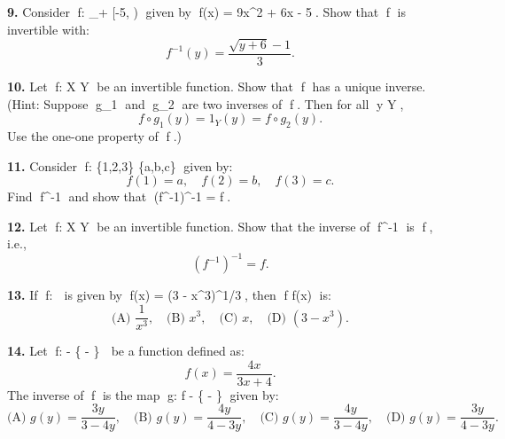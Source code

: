 \documentclass{article}
\begin{document}
\textbf{9.} Consider f: _+ \to [-5, \infty) given by f(x) = 9x^2 + 6x - 5. Show that f is invertible with:
\[
f^{-1}(y) = \frac{\sqrt{y+6} -1}{3}.
\]

\textbf{10.} Let f: X \to Y be an invertible function. Show that f has a unique inverse.  
(Hint: Suppose g_1 and g_2 are two inverses of f. Then for all y \in Y,  
\[
f \circ g_1(y) = 1_Y(y) = f \circ g_2(y).
\]
Use the one-one property of f.)

\textbf{11.} Consider f: \{1,2,3\} \to \{a,b,c\} given by:
\[
f(1) = a, \quad f(2) = b, \quad f(3) = c.
\]
Find f^{-1} and show that (f^{-1})^{-1} = f.

\textbf{12.} Let f: X \to Y be an invertible function. Show that the inverse of f^{-1} is f, i.e.,
\[
(f^{-1})^{-1} = f.
\]

\textbf{13.} If f:  \to {} is given by f(x) = (3 - x^3)^{1/3}, then f \circ f(x) is:
\[
\text{(A) } \frac{1}{x^3}, \quad
\text{(B) } x^3, \quad
\text{(C) } x, \quad
\text{(D) } (3 - x^3).
\]

\textbf{14.} Let f:  - \left\{ - \right\} \to {} be a function defined as:
\[
f(x) = \frac{4x}{3x+4}.
\]
The inverse of f is the map g:  f \to {} - \left\{ - \right\} given by:
\[
\text{(A) } g(y) = \frac{3y}{3 - 4y}, \quad
\text{(B) } g(y) = \frac{4y}{4 - 3y}, \quad
\text{(C) } g(y) = \frac{4y}{3 - 4y}, \quad
\text{(D) } g(y) = \frac{3y}{4 - 3y}.
\]
\end{document}
